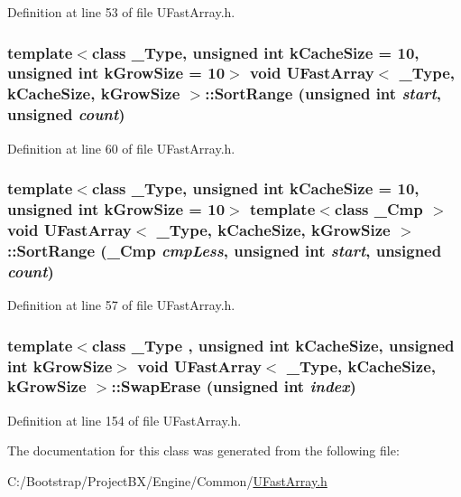 Definition at line 53 of file UFastArray.h.\hypertarget{class_u_fast_array_49348ec3f8dc21f778392013f4b9c966}{
\subsubsection[{SortRange}]{\setlength{\rightskip}{0pt plus 5cm}template$<$class \_\-Type, unsigned int kCacheSize = 10, unsigned int kGrowSize = 10$>$ void {\bf UFastArray}$<$ \_\-Type, kCacheSize, kGrowSize $>$::SortRange (unsigned int {\em start}, \/  unsigned {\em count})}}
\label{class_u_fast_array_49348ec3f8dc21f778392013f4b9c966}




Definition at line 60 of file UFastArray.h.\hypertarget{class_u_fast_array_31a5d8dde4048ed86ab37bab67ddc4e9}{
\subsubsection[{SortRange}]{\setlength{\rightskip}{0pt plus 5cm}template$<$class \_\-Type, unsigned int kCacheSize = 10, unsigned int kGrowSize = 10$>$ template$<$class \_\-Cmp $>$ void {\bf UFastArray}$<$ \_\-Type, kCacheSize, kGrowSize $>$::SortRange (\_\-Cmp {\em cmpLess}, \/  unsigned int {\em start}, \/  unsigned {\em count})}}
\label{class_u_fast_array_31a5d8dde4048ed86ab37bab67ddc4e9}




Definition at line 57 of file UFastArray.h.\hypertarget{class_u_fast_array_2f2a33eef1bbf4679b8a4231bf4228aa}{
\subsubsection[{SwapErase}]{\setlength{\rightskip}{0pt plus 5cm}template$<$class \_\-Type , unsigned int kCacheSize, unsigned int kGrowSize$>$ void {\bf UFastArray}$<$ \_\-Type, kCacheSize, kGrowSize $>$::SwapErase (unsigned int {\em index})}}
\label{class_u_fast_array_2f2a33eef1bbf4679b8a4231bf4228aa}




Definition at line 154 of file UFastArray.h.

The documentation for this class was generated from the following file:\begin{CompactItemize}
\item 
C:/Bootstrap/ProjectBX/Engine/Common/\hyperlink{_u_fast_array_8h}{UFastArray.h}\end{CompactItemize}
